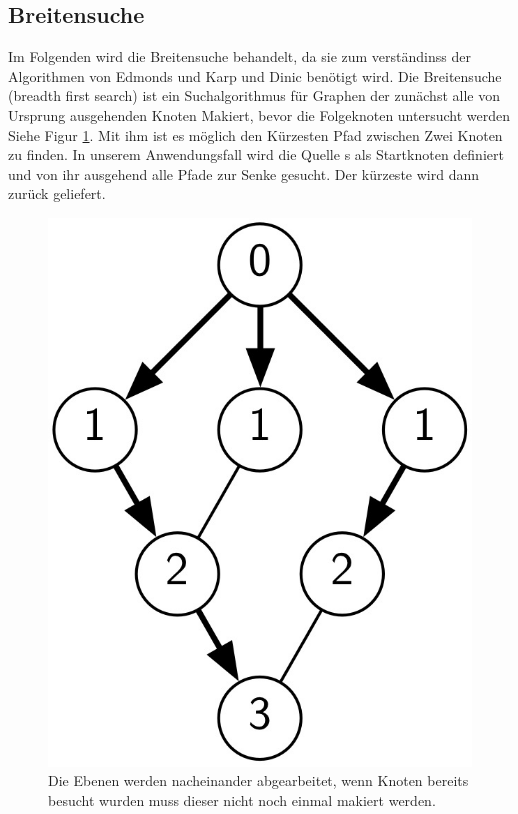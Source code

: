 \documentclass[a4paper]{llncs}
\begin{document}
\subsection{Breitensuche}
\label{Breitensuche}
Im Folgenden wird die Breitensuche behandelt, da sie zum verständinss der Algorithmen von Edmonds und Karp und Dinic benötigt wird.
Die Breitensuche (breadth first search) ist ein Suchalgorithmus für Graphen der zunächst alle von Ursprung ausgehenden Knoten Makiert, bevor die Folgeknoten untersucht werden Siehe Figur \ref{fig:Graph2}.
Mit ihm ist es möglich den Kürzesten Pfad zwischen Zwei Knoten zu finden.
In unserem Anwendungsfall wird die Quelle s als Startknoten definiert und von ihr ausgehend alle Pfade zur Senke gesucht. Der kürzeste wird dann zurück geliefert.
\begin{figure}[htbp] 
  \centering
     \includegraphics[scale=0.14]{BreitensucheGraph} 
  \caption{Die Ebenen werden nacheinander abgearbeitet, wenn Knoten bereits besucht wurden muss dieser nicht noch einmal makiert werden.}
  \label{fig:Graph2}
\end{figure}
\end{document}
